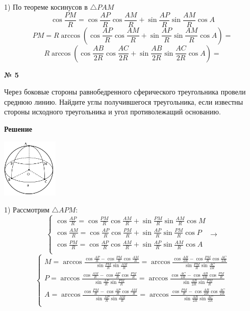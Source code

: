     1) По теореме косинусов в $\triangle PAM$
    \[
        \cos \frac{PM}{R} = \cos \frac{AP}{R}\cos\frac{AM}{R} + \sin\frac{AP}{R}\sin\frac{AM}{R}\cos A
    \]
    \[
        PM = R\arccos \left(\cos \frac{AP}{R}\cos\frac{AM}{R} + \sin\frac{AP}{R}\sin\frac{AM}{R}\cos A\right) =
    \]
    \[
        R\arccos \left(\cos \frac{AB}{2R}\cos\frac{AC}{2R} + \sin\frac{AB}{2R}\sin\frac{AC}{2R}\cos A\right) =
    \]

    \begin{center}
        \textbf{№ 5}
    \end{center}

    Через боковые стороны равнобедренного сферического треугольника провели среднюю линию.
    Найдите углы получившегося треугольника, если известны стороны исходного треугольника и угол противолежащий основанию.

    \textbf{Решение}\\

    \begin{center}
        \includegraphics[width=0.2\textwidth]{images/img6}\\
    \end{center}

    1) Рассмотрим $\triangle APM$:
    \[
        \begin{cases}
            \cos \frac{AP}{R} = \cos \frac{PM}{R}\cos\frac{AM}{R} + \sin \frac{PM}{R}\sin\frac{AM}{R}\cos M\\
            \cos \frac{AM}{R} = \cos \frac{AP}{R}\cos\frac{PM}{R} + \sin \frac{AP}{R}\sin\frac{PM}{R}\cos P\\
            \cos \frac{PM}{R} = \cos \frac{AP}{R}\cos\frac{AM}{R} + \sin \frac{AP}{R}\sin\frac{AM}{R}\cos A\\
        \end{cases}
        \rightarrow
    \]
    \[
        \begin{cases}
            M = \arccos \frac{\cos \frac{AP}{R} - \cos \frac{PM}{R}\cos\frac{AM}{R}}{\sin \frac{PM}{R}\sin\frac{AM}{R}}=
            \arccos \frac{\cos \frac{AB}{2R} - \cos \frac{PM}{R}\cos\frac{AC}{2R}}{\sin \frac{PM}{R}\sin\frac{AC}{2R}}\\
            P = \arccos \frac{\cos \frac{AM}{R} -  \cos \frac{AP}{R}\cos\frac{PM}{R}}{\sin \frac{AP}{R}\sin\frac{PM}{R}}=
            \arccos \frac{\cos \frac{AC}{2R} -  \cos \frac{AB}{2R}\cos\frac{PM}{R}}{\sin \frac{AB}{2R}\sin\frac{PM}{R}}\\
            A = \arccos \frac{\cos \frac{PM}{R} - \cos \frac{AP}{R}\cos\frac{AM}{R}}{\sin \frac{AP}{R}\sin\frac{AM}{R}}=
            \arccos \frac{\cos \frac{PM}{R} - \cos \frac{AB}{2R}\cos\frac{AC}{2R}}{\sin \frac{AB}{2R}\sin\frac{AC}{2R}}\\
        \end{cases}
    \]

